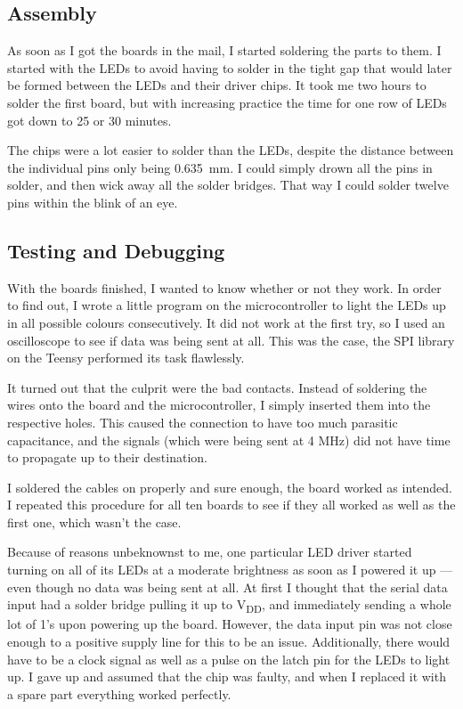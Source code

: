 \documentclass[a4paper, 11pt, titlepage]{report}
\def \vdd {V\textsubscript{DD}}
\begin{document}
\subsection{Assembly}

As soon as I got the boards in the mail, I started soldering the parts to them. I started with the
LEDs to avoid having to solder in the tight gap that would later be formed between the LEDs and
their driver chips. It took me two hours to solder the first board, but with increasing practice
the time for one row of LEDs got down to 25 or 30 minutes.

The chips were a lot easier to solder than the LEDs, despite the distance between the individual
pins only being \SI{0.635}{\milli\meter}. I could simply drown all the pins in solder, and then 
wick away all the solder bridges. That way I could solder twelve pins within the blink of an eye.




\subsection {Testing and Debugging}

With the boards finished, I wanted to know whether or not they work. In order to find out, I wrote
a little program on the microcontroller to light the LEDs up in all possible colours consecutively.
It did not work at the first try, so I used an oscilloscope to see if data was being sent at all. 
This was the case, the SPI library on the Teensy performed its task flawlessly.

It turned out that the culprit were the bad contacts. Instead of soldering the wires onto the board
and the microcontroller, I simply inserted them into the respective holes. This caused the 
connection to have too much parasitic capacitance, and the signals (which were being sent at 4 MHz)
did not have time to propagate up to their destination.

I soldered the cables on properly and sure enough, the board worked as intended. I repeated this
procedure for all ten boards to see if they all worked as well as the first one, which wasn't the 
case.

Because of reasons unbeknownst to me, one particular LED driver started turning on all of its LEDs
at a moderate brightness as soon as I powered it up --- even though no data was being sent at all.
At first I thought that the serial data input had a solder bridge pulling it up to \vdd, and
immediately sending a whole lot of 1's upon powering up the board. However, the data input pin was
not close enough to a positive supply line for this to be an issue. Additionally, there would have 
to be a clock signal as well as a pulse on the latch pin for the LEDs to light up. I gave up and 
assumed that the chip was faulty, and when I replaced it with a spare part everything worked 
perfectly.
\end{document}
